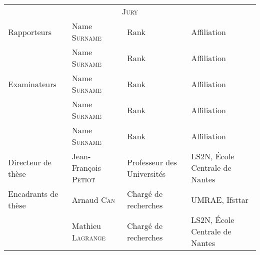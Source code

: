 \begin{cover}
  \noindent
  \begin{tabular}{llll} %
    \multicolumn{4}{c}{\scshape\color{teal}\Large Jury} \\[10pt]
    Rapporteurs & Name \textsc{Surname} & Rank & Affiliation\\
                & Name \textsc{Surname} & Rank & Affiliation \\[10pt]
    Examinateurs & Name \textsc{Surname} & Rank & Affiliation
    \\
                & Name \textsc{Surname} & Rank & Affiliation \\
                & Name \textsc{Surname} & Rank & Affiliation \\[10pt]
    Directeur de thèse & Jean-François \textsc{Petiot} & Professeur des Universités & LS2N, École Centrale de Nantes \\
    Encadrants de thèse & Arnaud \textsc{Can} & Chargé de recherches & UMRAE, Ifsttar \\
     & Mathieu \textsc{Lagrange} & Chargé de recherches & LS2N, École Centrale de Nantes 
  \end{tabular}
\end{cover}